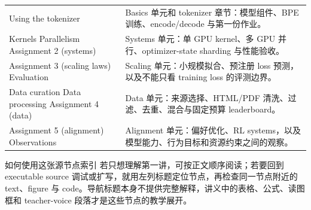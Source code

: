 \documentclass[a4paper]{article}
\begin{document}
\begin{longtable}{p{}p{}}
Using the tokenizer & Basics 单元和 tokenizer 章节：模型组件、BPE 训练、encode/decode 与第一份作业。 \\
Kernels\newline
Parallelism\newline
Assignment 2 (systems) & Systems 单元：单 GPU kernel、多 GPU 并行、optimizer-state sharding 与性能验收。 \\
Assignment 3 (scaling laws)\newline
Evaluation & Scaling 单元：小规模拟合、预注册 loss 预测，以及不能只看 training loss 的评测边界。 \\
Data curation\newline
Data processing\newline
Assignment 4 (data) & Data 单元：来源选择、HTML/PDF 清洗、过滤、去重、混合与固定预算 leaderboard。 \\
Assignment 5 (alignment)\newline
Observations & Alignment 单元：偏好优化、RL systems，以及模型能力、行为目标和资源约束之间的观察。 \\
\bottomrule
\end{longtable}

\begin{knowledgebox}{如何使用这张源节点索引}
若只想理解第一讲，可按正文顺序阅读；若要回到 executable source 调试或扩写，就用左列标题定位节点，再检查同一节点附近的 text、figure 与 code。导航标题本身不提供完整解释，讲义中的表格、公式、读图框和 teacher-voice 段落才是这些节点的教学展开。
\end{knowledgebox}
\end{document}
